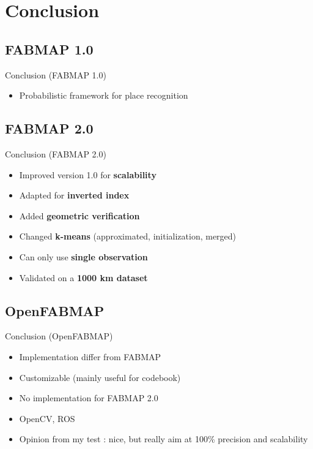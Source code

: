 \section{Conclusion}

\subsection{FABMAP 1.0}
\begin{frame}{Conclusion (FABMAP 1.0)}
    \begin{itemize}
        \item Probabilistic framework for place recognition
    \end{itemize}
\end{frame}

\subsection{FABMAP 2.0}
\begin{frame}{Conclusion (FABMAP 2.0)}
    \begin{itemize}
        \item Improved version 1.0 for \textbf{scalability}
        \item Adapted for \textbf{inverted index}
        \item Added \textbf{geometric verification}
        \item Changed \textbf{k-means} (approximated, initialization, merged)
        \item Can only use \textbf{single observation}
        \item Validated on a \textbf{1000 km dataset}
    \end{itemize}
\end{frame}

\subsection{OpenFABMAP}
\begin{frame}{Conclusion (OpenFABMAP)}
    \begin{itemize}
        \item Implementation differ from FABMAP
        \item Customizable (mainly useful for codebook)
        \item No implementation for FABMAP 2.0
        \item OpenCV, ROS
        \item Opinion from my test : nice, but really aim at 100\% precision and scalability
    \end{itemize}
\end{frame}
